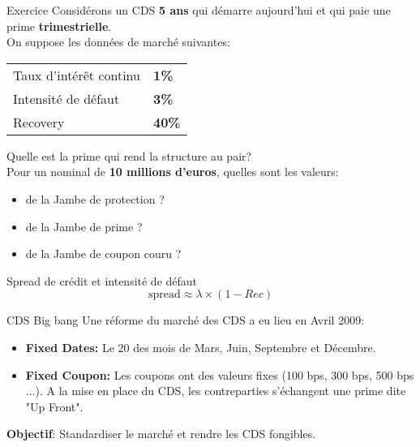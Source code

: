 \documentclass{beamer}
\begin{document}
\begin{frame}{Exercice}
Considérons un CDS \textbf{5 ans} qui démarre aujourd'hui et qui paie une prime \textbf{trimestrielle}.\\
\vspace{0.5cm}
On suppose les données de marché suivantes:\\
\begin{center}
\begin{tabular}{|l|l|}
\hline
Taux d'intérêt continu&\textbf{1\%}\\
Intensité de défaut&\textbf{3\%}\\
Recovery&\textbf{40\%}\\
\hline
\end{tabular}
\end{center}
Quelle est la prime qui rend la structure au pair?\\
Pour un nominal de \textbf{10 millions d'euros}, quelles sont les valeurs:\\
\begin{itemize}
\item de la Jambe de protection ?\\
\item de la Jambe de prime ? \\
\item de la Jambe de coupon couru ?\\
\end{itemize}
\end{frame}

\begin{frame}{Spread de crédit et intensité de défaut}
\Huge
\[
\text{spread}\approx\lambda \times (1-Rec)
\]
\end{frame}


\begin{frame}{CDS Big bang}
Une réforme du marché des CDS a eu lieu en Avril 2009:\\
\vspace{0.5cm}
\begin{itemize}
\item \textbf{Fixed Dates:} Le 20 des mois de Mars, Juin, Septembre et Décembre.
\item \textbf{Fixed Coupon:} Les coupons ont des valeurs fixes (100 bps, 300 bps, 500 bps ...). A la mise en place du CDS, les contreparties s'échangent une prime dite "Up Front".
\end{itemize}
\vspace{0.5cm}
\textbf{Objectif}: Standardiser le marché et rendre les CDS fongibles.
\end{frame}
\end{document}
